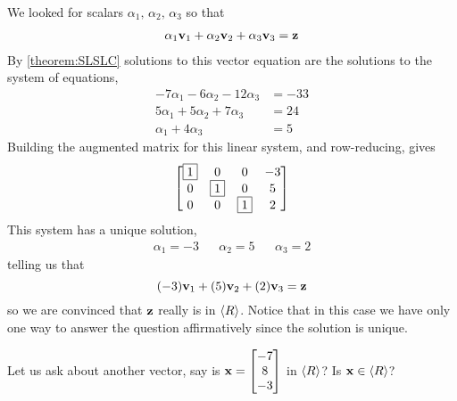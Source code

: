 \documentclass{ximera}
\begin{document}
\begin{example}
\begin{question}
\begin{feedback}[correct]
\begin{question}
        \begin{feedback}[correct]
          We looked for scalars $\alpha_1,\,\alpha_2,\,\alpha_3$ so that
          \begin{align*}
            \alpha_1\mathbf{v}_1+\alpha_2\mathbf{v}_2+\alpha_3\mathbf{v}_3&=\mathbf{z}\\
          \end{align*}
          By \ref{theorem:SLSLC} solutions to this vector equation are the solutions to the system of equations,
          \begin{align*}
            -7\alpha_1-6\alpha_2-12\alpha_3&=-33\\
            5\alpha_1+5\alpha_2+7\alpha_3&=24\\
            \alpha_1+4\alpha_3&=5
          \end{align*}
          Building the augmented matrix for this linear system, and row-reducing, gives
          \[
            \begin{bmatrix}
              \fbox{1}&0&0&-3\\
              0&\fbox{1}&0&5\\
              0&0&\fbox{1}&2
            \end{bmatrix}
          \]
          This system has a unique solution,
          \begin{align*}
            \alpha_1 = -3&&\alpha_2 = 5&&\alpha_3 = 2
          \end{align*}
          telling us that
          \[
            (-3)\mathbf{v}_1+(5)\mathbf{v}_2+(2)\mathbf{v}_3=\mathbf{z}
          \]
          so we are convinced that $\mathbf{z}$ really is in $\left\langle R\right\rangle$.
          Notice that in this case we have only one way to answer the
          question affirmatively since the solution is unique.
        \end{feedback}
      \end{question}
    \end{feedback}
  \end{question}

  \begin{question}
    Let us ask about another vector, say is
    $\mathbf{x}=\begin{bmatrix}-7\\8\\-3\end{bmatrix}$ in $\left\langle R\right\rangle$?  Is
    $\mathbf{x}\in\left\langle R\right\rangle$?

    \begin{multipleChoice}
    \end{multipleChoice}


\end{question}
\end{example}
\end{document}
